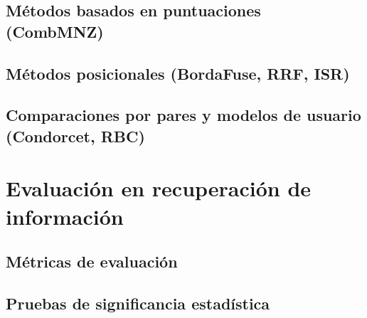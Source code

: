 \subsection{Métodos basados en puntuaciones (CombMNZ)}\label{subsec:marco-combmnz}

\subsection{Métodos posicionales (BordaFuse, RRF, ISR)}\label{subsec:marco-posicionales}

\subsection{Comparaciones por pares y modelos de usuario (Condorcet, RBC)}\label{subsec:marco-pares}

\section{Evaluación en recuperación de información}\label{sec:marco-evaluacion}

\subsection{Métricas de evaluación}\label{subsec:marco-metricas}

\subsection{Pruebas de significancia estadística}\label{subsec:marco-significancia}
